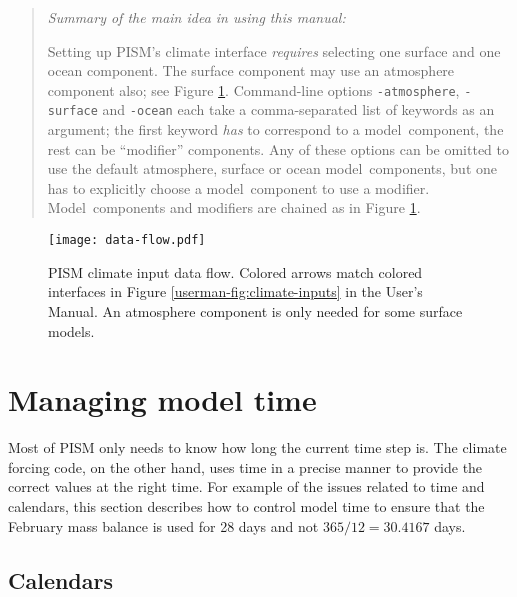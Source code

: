 \documentclass[titlepage,letterpaper,final]{scrartcl}
\begin{document}
\vspace{0.3in}

\begin{quote}
\begin{center}
\emph{Summary of the main idea in using this manual:}
\end{center}

Setting up PISM's climate interface \emph{requires} selecting one surface and one
ocean component. The surface component may use an atmosphere component also;
see Figure \ref{fig:climate-input-data-flow}. Command-line options
\texttt{-atmosphere}, \texttt{-surface} and \texttt{-ocean} each take a
comma-separated list of keywords as an argument; the first keyword \emph{has}
to correspond to a model~component, the rest can be ``modifier'' components.
Any of these options can be omitted to use the default atmosphere, surface or
ocean model~components, but one has to explicitly choose a model~component
to use a modifier. Model~components and modifiers are chained as in Figure
\ref{fig:climate-input-data-flow}.
\end{quote}

\begin{figure}
  \centering
  \texttt{[image: data-flow.pdf]}
  \caption{PISM climate input data flow.  Colored arrows match colored interfaces in
    Figure \ref*{userman-fig:climate-inputs} in the User's Manual.  An atmosphere component is only needed for some surface models.}
  \label{fig:climate-input-data-flow}
\end{figure}


\newpage
\section{Managing model time}
\label{sec:model-time}

Most of PISM only needs to know  how long the current time step is. The climate
forcing  code,  on  the other  hand,  uses  time in a precise manner
to provide the correct values at the right time.  For example of the issues related to time
and calendars, this section describes how to control model time to ensure
that the February mass balance is used for 28 days and not $365/12 = 30.4167$ days.


\subsection{Calendars}
\label{sec:calendars}
\end{document}
